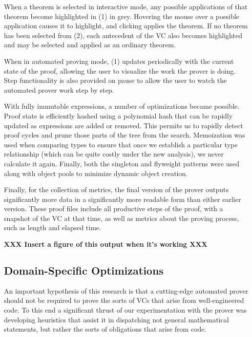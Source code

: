 When a theorem is selected in interactive mode, any possible applications of that theorem become highlighted in (1) in grey.  Hovering the mouse over a possible application causes it to highlight, and clicking applies the theorem.  If no theorem has been selected from (2), each antecedent of the VC also becomes highlighted and may be selected and applied as an ordinary theorem.

When in automated proving mode, (1) updates periodically with the current state of the proof, allowing the user to visualize the work the prover is doing.  Step functionality is also provided on pause to allow the user to watch the automated prover work step by step.

With fully immutable expressions, a number of optimizations became possible.  Proof state is efficiently hashed using a polynomial hash that can be rapidly updated as expressions are added or removed.  This permits us to rapidly detect proof cycles and prune those parts of the tree from the search.  Memoization was used when comparing types to ensure that once we establish a particular type relationship (which can be quite costly under the new analysis), we never calculate it again.  Finally, both the singleton and flyweight patterns were used along with object pools to minimize dynamic object creation.

Finally, for the collection of metrics, the final version of the prover outputs significantly more data in a significantly more readable form than either earlier version.  These proof files include all productive steps of the proof, with a snapshot of the VC at that time, as well as metrics about the proving process, such as length and elapsed time.

\textbf{XXX Insert a figure of this output when it's working XXX}

	\subsection{Domain-Specific Optimizations\label{domainSpecific}}

An important hypothesis of this research is that a cutting-edge automated prover should not be required to prove the sorts of VCs that arise from well-engineered code.  To this end a significant thrust of our experimentation with the prover was developing heuristics that assist it in dispatching not general mathematical statements, but rather the sorts of obligations that arise from code.

